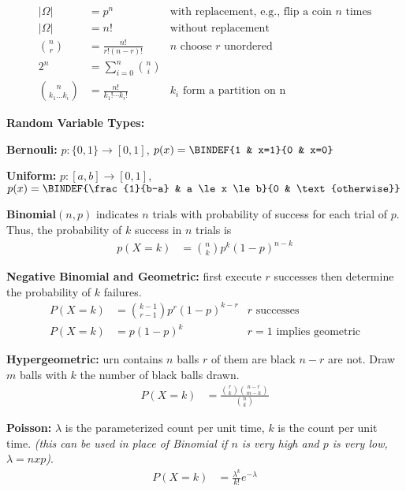 \documentclass[10pt,a4paper]{report}
\begin{document}
\begin{description}
	\begin{align*}
		|\Omega| &= p^n & \text{with replacement, e.g., flip a coin $n$ times}\\
		|\Omega| &= n! & \text{without replacement}\\
		\binom{n}{r} &= \frac{n!}{r!(n-r)!} & \text{$n$ choose $r$ unordered} \\
		2^n &= \sum_{i=0}^n \binom{n}{i} \\
		\binom{n}{k_1\dots k_i} &= \frac{n!}{k_1!\cdots k_i!} & \text{$k_i$ form a partition on n}
	\end{align*}
\item \textbf{Random Variable Types:}
\begin{description}
	\item \textbf{Bernouli:} $p:\{0,1\}\to [0,1]$, $p(x)=\BINDEF{1 & x=1}{0 & x=0}$
	\item \textbf{Uniform:} $p:[a,b] \to [0,1]$, $p(x) = \BINDEF{\frac{1}{b-a} & a \le x \le b}{0 & \text{otherwise}}$
	\item \textbf{Binomial$(n,p)$} indicates $n$ trials with probability of success for each trial of $p$.  Thus, the probability of $k$ success in $n$ trials is
	\begin{align*}
		p(X=k) &= \binom{n}{k}p^k(1-p)^{n-k}
	\end{align*}
	\item \textbf{Negative Binomial and Geometric:} first execute $r$ successes then determine the probability of $k$ failures.
	\begin{align*}
		P(X=k) &= \binom{k-1}{r-1}p^r(1-p)^{k-r} & \text{$r$ successes}\\ 
		P(X=k) &= p(1-p)^k & \text{$r=1$ implies geometric}
	\end{align*}
	\item \textbf{Hypergeometric:} urn contains $n$ balls $r$ of them are black $n-r$ are not.  Draw $m$ balls with $k$ the number of black balls drawn.
	\begin{align*}
		P(X=k) &= \frac{\binom{r}{k}\binom{n-r}{m-k}}{\binom{n}{k}}
	\end{align*}
	\item \textbf{Poisson:} $\lambda$ is the parameterized count per unit time, $k$ is the count per unit time. \textit{(this can be used in place of Binomial if $n$ is very high and $p$ is very low, $\lambda = nxp$)}.
	\begin{align*}
		P(X=k) &= \frac{\lambda^k}{k!}e^{-\lambda}
	\end{align*}
	

\end{description}
\end{description}
\end{document}
